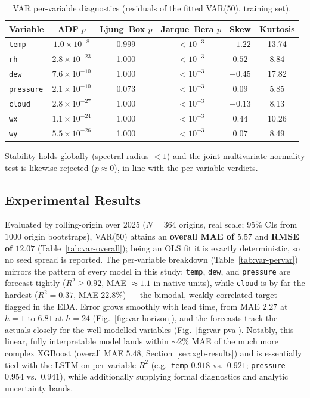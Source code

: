 \documentclass[12pt,a4paper,oneside]{report}
\begin{document}
\begin{table}[H]\centering
\caption{VAR per-variable diagnostics (residuals of the fitted VAR(50), training set).}
\label{tab:var-diag}
\begin{tabular}{lccccc}
\toprule
\textbf{Variable} & \textbf{ADF $p$} & \textbf{Ljung--Box $p$} & \textbf{Jarque--Bera $p$} & \textbf{Skew} & \textbf{Kurtosis} \\
\midrule
\texttt{temp}     & $1.0\times10^{-8}$  & 0.999 & $<10^{-3}$ & $-1.22$ & 13.74 \\
\texttt{rh}       & $2.8\times10^{-23}$ & 1.000 & $<10^{-3}$ & $ 0.52$ &  8.84 \\
\texttt{dew}      & $7.6\times10^{-10}$ & 1.000 & $<10^{-3}$ & $-0.45$ & 17.82 \\
\texttt{pressure} & $2.1\times10^{-10}$ & 0.073 & $<10^{-3}$ & $ 0.09$ &  5.85 \\
\texttt{cloud}    & $2.8\times10^{-27}$ & 1.000 & $<10^{-3}$ & $-0.13$ &  8.13 \\
\texttt{wx}       & $1.1\times10^{-24}$ & 1.000 & $<10^{-3}$ & $ 0.44$ & 10.26 \\
\texttt{wy}       & $5.5\times10^{-26}$ & 1.000 & $<10^{-3}$ & $ 0.07$ &  8.49 \\
\bottomrule
\end{tabular}
\end{table}
Stability holds globally (spectral radius $<1$) and the joint multivariate normality
test is likewise rejected ($p\approx0$), in line with the per-variable verdicts.

\subsection{Experimental Results}
\label{sec:var-results}
Evaluated by rolling-origin over 2025 ($N=364$ origins, real scale; 95\% CIs from
$1000$ origin bootstraps), VAR(50) attains an \textbf{overall MAE of $5.57$} and
\textbf{RMSE of $12.07$} (Table~\ref{tab:var-overall}); being an OLS fit it is
exactly deterministic, so no seed spread is reported. The per-variable breakdown
(Table~\ref{tab:var-pervar}) mirrors the pattern of every model in this study:
\texttt{temp}, \texttt{dew}, and \texttt{pressure} are forecast tightly
($R^2 \ge 0.92$, MAE $\approx 1.1$ in native units), while \texttt{cloud} is by far
the hardest ($R^2=0.37$, MAE $22.8\%$) --- the bimodal, weakly-correlated target
flagged in the EDA. Error grows smoothly with lead time, from MAE $2.27$ at $h{=}1$
to $6.81$ at $h{=}24$ (Fig.~\ref{fig:var-horizon}), and the forecasts track the
actuals closely for the well-modelled variables (Fig.~\ref{fig:var-pva}). Notably,
this linear, fully interpretable model lands within $\sim$2\% MAE of the much more
complex XGBoost (overall MAE $5.48$, Section~\ref{sec:xgb-results}) and is
essentially tied with the LSTM on per-variable $R^2$ (e.g.\ \texttt{temp}
$0.918$ vs.\ $0.921$; \texttt{pressure} $0.954$ vs.\ $0.941$), while additionally
supplying formal diagnostics and analytic uncertainty bands.
\end{document}

